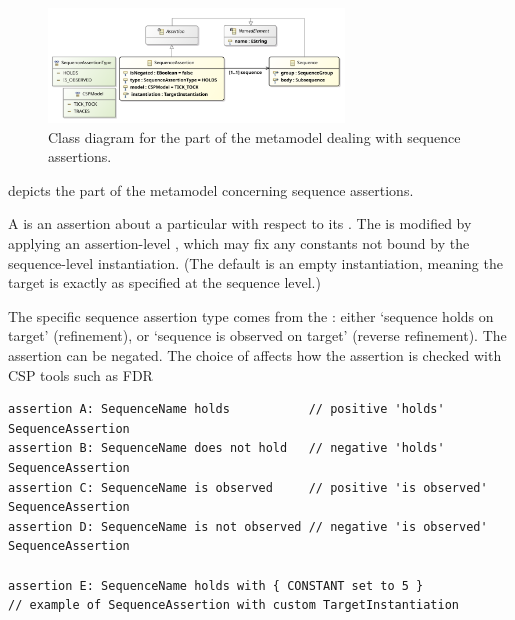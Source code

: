 \begin{figure}[htb]
	\centering
	\includegraphics[width=0.7\textwidth]{diagrams/Assertions}
	\caption{Class diagram for the part of the \langname{} metamodel dealing with sequence assertions.}
	\label{fig:seq-metamodel-assertions}
\end{figure}

 depicts the part of the metamodel concerning
sequence assertions.

A \msequenceproperty{} is an assertion about a particular \msequence{} with
respect to its \mtarget.  The \mtarget{} is modified by applying an
assertion-level \mtargetinstantiation, which may fix any constants not bound
by the sequence-level instantiation.  (The default is an empty instantiation,
meaning the target is exactly as specified at the sequence level.)

The specific sequence assertion type comes from the \msequencepropertytype:
either `sequence holds on target' (refinement), or `sequence is observed on
target' (reverse refinement).  The assertion can be negated.  The choice of
\mcspmodel{} affects how the assertion is checked with CSP tools such as FDR

\begin{lstlisting}[style=Example]
assertion A: SequenceName holds           // positive 'holds' SequenceAssertion
assertion B: SequenceName does not hold   // negative 'holds' SequenceAssertion
assertion C: SequenceName is observed     // positive 'is observed' SequenceAssertion
assertion D: SequenceName is not observed // negative 'is observed' SequenceAssertion

assertion E: SequenceName holds with { CONSTANT set to 5 }
// example of SequenceAssertion with custom TargetInstantiation
\end{lstlisting}

